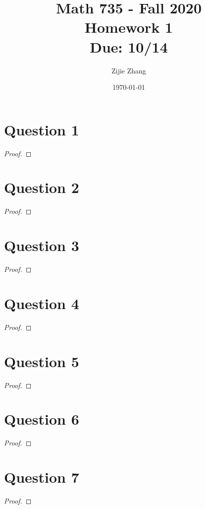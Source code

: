 \documentclass{article}
\title{Math 735 - Fall 2020\\
        {\Large \textbf{Homework 1}}\\
        {\normalsize \textbf{Due: 10/14}}
    }
\author{Zijie Zhang}
\date{\today}
\begin{document}
    \maketitle
\section*{Question 1}
    \begin{proof}
    
    \end{proof}

\section*{Question 2}
    \begin{proof}

    \end{proof}

\section*{Question 3}
    \begin{proof}

    \end{proof}

\section*{Question 4}
    \begin{proof}
        
    \end{proof}

\section*{Question 5}
    \begin{proof}

    \end{proof}

\section*{Question 6}
    \begin{proof}

    \end{proof}

\section*{Question 7}
    \begin{proof}

    \end{proof}
\end{document}
